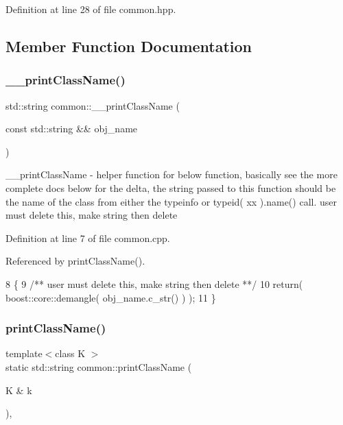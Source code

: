 Definition at line 28 of file common.\+hpp.



\subsection{Member Function Documentation}
\hypertarget{classcommon_a7ca2338596041e14a38de0f63d1c1e31}{}\label{classcommon_a7ca2338596041e14a38de0f63d1c1e31} 
\subsubsection{\texorpdfstring{\+\_\+\+\_\+print\+Class\+Name()}{\_\_printClassName()}}
{\footnotesize\ttfamily std\+::string common\+::\+\_\+\+\_\+print\+Class\+Name (\begin{DoxyParamCaption}\item[{const std\+::string \&\&}]{obj\+\_\+name }\end{DoxyParamCaption})\hspace{0.3cm}{\ttfamily [static]}}

\+\_\+\+\_\+print\+Class\+Name -\/ helper function for below function, basically see the more complete docs below for the delta, the string passed to this function should be the name of the class from either the typeinfo or typeid( xx ).name() call. user must delete this, make string then delete 

Definition at line 7 of file common.\+cpp.



Referenced by print\+Class\+Name().


\begin{DoxyCode}
8 \{\textcolor{comment}{}
9 \textcolor{comment}{   /** user must delete this, make string then delete **/}
10    \textcolor{keywordflow}{return}( boost::core::demangle( obj\_name.c\_str() ) );
11 \}
\end{DoxyCode}
\hypertarget{classcommon_aec4b942352abd180c71fca2c0dbd70b7}{}\label{classcommon_aec4b942352abd180c71fca2c0dbd70b7} 
\subsubsection{\texorpdfstring{print\+Class\+Name()}{printClassName()}}
{\footnotesize\ttfamily template$<$class K $>$ \\
static std\+::string common\+::print\+Class\+Name (\begin{DoxyParamCaption}\item[{K \&}]{k }\end{DoxyParamCaption})\hspace{0.3cm}{\ttfamily [inline]}, {\ttfamily [static]}}


